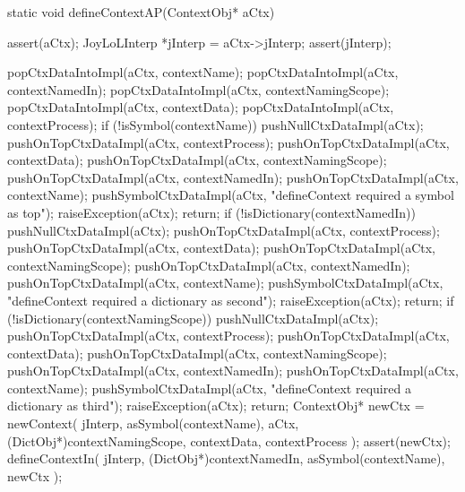 \startCCode
static void defineContextAP(ContextObj* aCtx) {
  assert(aCtx);
  JoyLoLInterp *jInterp = aCtx->jInterp;
  assert(jInterp);
  
  popCtxDataIntoImpl(aCtx, contextName);
  popCtxDataIntoImpl(aCtx, contextNamedIn);
  popCtxDataIntoImpl(aCtx, contextNamingScope);
  popCtxDataIntoImpl(aCtx, contextData);
  popCtxDataIntoImpl(aCtx, contextProcess);
  if (!isSymbol(contextName)) {
    pushNullCtxDataImpl(aCtx);
    pushOnTopCtxDataImpl(aCtx, contextProcess);
    pushOnTopCtxDataImpl(aCtx, contextData);
    pushOnTopCtxDataImpl(aCtx, contextNamingScope);
    pushOnTopCtxDataImpl(aCtx, contextNamedIn);
    pushOnTopCtxDataImpl(aCtx, contextName);
    pushSymbolCtxDataImpl(aCtx,
      "defineContext required a symbol as top");
    raiseException(aCtx);
    return;
  }
  if (!isDictionary(contextNamedIn)) {
    pushNullCtxDataImpl(aCtx);
    pushOnTopCtxDataImpl(aCtx, contextProcess);
    pushOnTopCtxDataImpl(aCtx, contextData);
    pushOnTopCtxDataImpl(aCtx, contextNamingScope);
    pushOnTopCtxDataImpl(aCtx, contextNamedIn);
    pushOnTopCtxDataImpl(aCtx, contextName);
    pushSymbolCtxDataImpl(aCtx,
      "defineContext required a dictionary as second");
    raiseException(aCtx);
    return;
  }
  if (!isDictionary(contextNamingScope)) {
    pushNullCtxDataImpl(aCtx);
    pushOnTopCtxDataImpl(aCtx, contextProcess);
    pushOnTopCtxDataImpl(aCtx, contextData);
    pushOnTopCtxDataImpl(aCtx, contextNamingScope);
    pushOnTopCtxDataImpl(aCtx, contextNamedIn);
    pushOnTopCtxDataImpl(aCtx, contextName);
    pushSymbolCtxDataImpl(aCtx,
      "defineContext required a dictionary as third");
    raiseException(aCtx);
    return;
  }
  ContextObj* newCtx = newContext(
    jInterp,
    asSymbol(contextName),
    aCtx,
    (DictObj*)contextNamingScope,
    contextData,
    contextProcess
  );
  assert(newCtx);
  defineContextIn(
    jInterp,
    (DictObj*)contextNamedIn,
    asSymbol(contextName),
    newCtx
  );
}
\stopCCode

